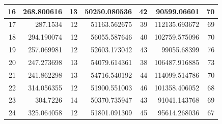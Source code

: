 \begin{table}
\begin{adjustwidth}{}{}
{{\begin{tabular}{|r|r|r|r|r|r|r|}
					\hline
					16                                         & 268.800616                   & 13                                    & 50250.080536                   & 42                                    & 90599.06601                  & 70                                     \\ 
					\hline
					17                                         & 287.1534                     & 12                                    & 51163.562675                   & 39                                    & 112135.693672                & 69                                     \\ 
					\hline
					18                                         & 294.190074                   & 12                                    & 56055.587646                   & 40                                    & 102759.575096                & 70                                     \\ 
					\hline
					19                                         & 257.069981                   & 12                                    & 52603.173042                   & 43                                    & 99055.68399                  & 76                                     \\ 
					\hline
					20                                         & 247.273698                   & 13                                    & 54079.614361                   & 38                                    & 106487.916885                & 73                                     \\ 
					\hline
					21                                         & 241.862298                   & 13                                    & 54716.540192                   & 44                                    & 114099.514786                & 70                                     \\ 
					\hline
					22                                         & 314.056355                   & 12                                    & 51900.551003                   & 46                                    & 101358.406052                & 68                                     \\ 
					\hline
					23                                         & 304.7226                     & 14                                    & 50370.735947                   & 43                                    & 91041.143768                 & 69                                     \\ 
					\hline
					24                                         & 325.064058                   & 12                                    & 51801.091309                   & 45                                    & 95614.268036                 & 67                                     \\ 

\end{tabular}}}
\end{adjustwidth}
\end{table}

